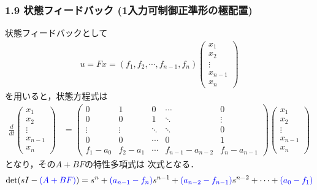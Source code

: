 \begin{frame}[t]
\frametitle{1.9 状態フィードバック (1入力可制御正準形の極配置)}
状態フィードバックとして
\small{
\begin{align}
 u = F x =
 (f_1, f_2, \cdots, f_{n-1}, f_{n})
 \left(\begin{array}{c}
        x_1 \\
    x_2 \\
    \vdots \\
    x_{n-1} \\
    x_n
       \end{array}\right)
\end{align}
}
を用いると，状態方程式は
\small{
\begin{align}
 \frac{d}{dt}
  \left(\begin{array}{c}
         x_1 \\
   x_2 \\
   \vdots \\
   x_{n-1} \\
   x_n
  \end{array}\right)
  &=
  \left(\begin{array}{ccccc}
     0      & 1      & 0      & \cdots & 0 \\
   0      & 0      & 1      & \ddots & \vdots \\
   \vdots & \vdots & \ddots & \ddots & 0 \\
   0      & 0      & \cdots & 0      & 1 \\
   f_1-a_0   & f_2 -a_1   & \cdots & f_{n-1} -a_{n-2} & f_{n} -a_{n-1}
  \end{array}\right)
  \left(\begin{array}{c}
   x_1 \\
   x_2 \\
   \vdots \\
   x_{n-1} \\
   x_n
  \end{array}\right)
\end{align}
}
となり，その$A+BF$の特性多項式は
次式となる．
\begin{equation}
 \mathop{\rm det}\nolimits (sI-\textcolor{blue}{(A+BF)}) = s^n + \textcolor{blue}{(a_{n-1}-f_n)} s^{n-1}
  + \textcolor{blue}{(a_{n-2}-f_{n-1})} s^{n-2} + \cdots 
  + \textcolor{blue}{(a_0-f_1)}
\label{eq:poleas_cha1}
\end{equation}
\end{frame}


